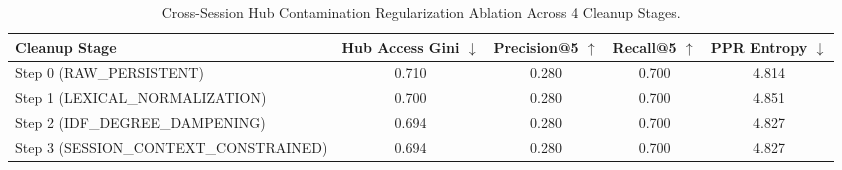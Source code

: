 \begin{table}[t]
\centering
\small
\caption{Cross-Session Hub Contamination Regularization Ablation Across 4 Cleanup Stages.}
\label{tab:hub_cleanup_ablation}
\begin{tabular}{lcccc}
\toprule
\textbf{Cleanup Stage} & \textbf{Hub Access Gini $\downarrow$} & \textbf{Precision@5 $\uparrow$} & \textbf{Recall@5 $\uparrow$} & \textbf{PPR Entropy $\downarrow$} \\
\midrule
Step 0 (RAW_PERSISTENT) & 0.710 & 0.280 & 0.700 & 4.814 \\
Step 1 (LEXICAL_NORMALIZATION) & 0.700 & 0.280 & 0.700 & 4.851 \\
Step 2 (IDF_DEGREE_DAMPENING) & 0.694 & 0.280 & 0.700 & 4.827 \\
Step 3 (SESSION_CONTEXT_CONSTRAINED) & 0.694 & 0.280 & 0.700 & 4.827 \\
\bottomrule
\end{tabular}
\end{table}